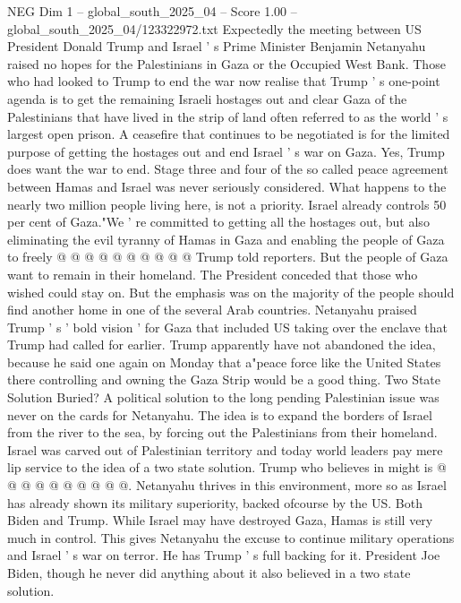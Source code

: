 \begin{textsample}{NEG Dim 1 – global\_south\_2025\_04 – Score 1.00 – global\_south\_2025\_04/123322972.txt}  \label{ex:f1_neg_136}
Expectedly the meeting between US President Donald Trump and Israel ' s Prime Minister Benjamin Netanyahu raised no hopes for the Palestinians in Gaza or the Occupied West Bank.
Those who had looked to Trump to end the war now realise that Trump ' s one-point agenda is to get the remaining Israeli hostages out and clear Gaza of the Palestinians that have lived in the strip of land often referred to as the world ' s largest open prison.
A ceasefire that continues to be negotiated is for the limited purpose of getting the hostages out and end Israel ' s war on Gaza.
Yes, Trump does want the war to end.
Stage three and four of the so called peace agreement between Hamas and Israel was never seriously considered.
What happens to the nearly two million people living here, is not a priority.
Israel already controls 50 per cent of Gaza."We ' re committed to getting all the hostages out, but also eliminating the evil tyranny of Hamas in Gaza and enabling the people of Gaza to freely @ @ @ @ @ @ @ @ @ @ Trump told reporters.
But the people of Gaza want to remain in their homeland.
The President conceded that those who wished could stay on.
But the emphasis was on the majority of the people should find another home in one of the several Arab countries.
Netanyahu praised Trump ' s ' bold vision ' for Gaza that included US taking over the enclave that Trump had called for earlier.
Trump apparently have not abandoned the idea, because he said one again on Monday that a"peace force like the United States there controlling and owning the Gaza Strip would be a good thing.
Two State Solution Buried?
A political solution to the long pending Palestinian issue was never on the cards for Netanyahu.
The idea is to expand the borders of Israel from the river to the sea, by forcing out the Palestinians from their homeland.
Israel was carved out of Palestinian territory and today world leaders pay mere lip service to the idea of a two state solution.
Trump who believes in might is @ @ @ @ @ @ @ @ @ @.
Netanyahu thrives in this environment, more so as Israel has already shown its military superiority, backed ofcourse by the US.
Both Biden and Trump.
While Israel may have destroyed Gaza, Hamas is still very much in control.
This gives Netanyahu the excuse to continue military operations and Israel ' s war on terror.
He has Trump ' s full backing for it.
President Joe Biden, though he never did anything about it also believed in a two state solution.

\end{textsample}
